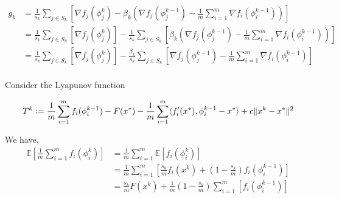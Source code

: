 \documentclass[11pt]{article}
\newcommand{\defeqq}{\vcentcolon=}
\begin{document}
\begin{align*}
	g_k &=  \frac{1}{s_k} \sum_{j \in S_k} \left[  \nabla f_j(\phi_j^{k}) - \beta_k \left(  \nabla f_j(\phi^{k-1}_j) - \frac{1}{m} \sum_{i = 1}^{m }  \nabla f_i (\phi_i^{k-1}) \right) \right] \\ 
	&=  \frac{1}{s_k} \sum_{j \in S_k} \left[  \nabla f_j(\phi_j^{k}) \right]- \frac{1}{s_k} \sum_{j \in S_k} \left[  \beta_k \left(  \nabla f_j(\phi^{k-1}_j) - \frac{1}{m} \sum_{i = 1}^{m }  \nabla f_i (\phi_i^{k-1}) \right) \right] \\ 
	&=  \frac{1}{s_k} \sum_{j \in S_k} \left[  \nabla f_j(\phi_j^{k}) \right]- \frac{ \beta_k }{s_k} \sum_{j \in S_k} \left[  \nabla f_j(\phi^{k-1}_j) - \frac{1}{m} \sum_{i = 1}^{m }  \nabla f_i (\phi_i^{k-1}) \right] \\ 
\end{align*}


Consider the Lyapunov function

\begin{equation}
	T^k \defeqq \frac{1}{m} \sum_{i =1}^{m} f_i(\phi_i^{k-1}) - F(x^*) - \frac{1}{m}  \sum_{i =1}^{m} \langle f'_i(x^*), \phi_i^{k-1} - x^*\rangle + c \|x^k - x^* \|^2
\end{equation}


We have,
\begin{align*}
\mathbb{E} \left[ \frac{1}{m} \sum_{i =1}^{m} f_i(\phi_i^{k}) \right] & =\frac{1}{m} \sum_{i =1}^{m} \mathbb{E} \left[ f_i(\phi_i^{k}) \right] \\
& = \frac{1}{m} \sum_{i =1}^{m} \left[ \frac{s_k}{m}  f_i(x^k) + \left(1 - \frac{s_k}{m} \right ) f_i(\phi_i^{k-1}) \right]\\
& = \frac{s_k}{m}  F(x^k) +\frac{1}{m}  \left(1 - \frac{s_k}{m} \right )\sum_{i =1}^{m} \left[  f_i(\phi_i^{k-1}) \right]\\
\end{align*}
\end{document}
